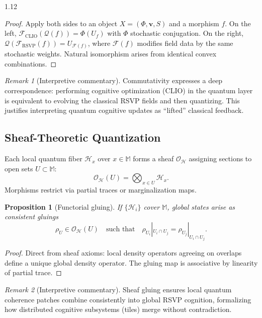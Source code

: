 \documentclass[12pt,a4paper]{article}
\numberwithin{equation}{section}
\newtheorem{proposition}{Proposition}[section]
\theoremstyle{remark}
\newtheorem{remark}{Remark}[section]
\theoremstyle{definition}
\begin{document}
\begin{spacing}{1.12}
\begin{proof}
Apply both sides to an object $X=(\Phi,\mathbf{v},S)$ and a morphism $f$. On the left, $\mathcal{F}_{\mathrm{CLIO}}(\mathcal{Q}(f))=\Phi(U_f)$ with $\Phi$ stochastic conjugation. On the right, $\mathcal{Q}(\mathcal{F}_{\mathrm{RSVP}}(f))=U_{\mathcal{F}(f)}$, where $\mathcal{F}(f)$ modifies field data by the same stochastic weights. Natural isomorphism arises from identical convex combinations.
\end{proof}

\begin{remark}[Interpretive commentary]
Commutativity expresses a deep correspondence: performing cognitive optimization (CLIO) in the quantum layer is equivalent to evolving the classical RSVP fields and then quantizing. This justifies interpreting quantum cognitive updates as “lifted” classical feedback.
\end{remark}

\subsection{Sheaf-Theoretic Quantization}\label{sec:F-sheaf}
Each local quantum fiber $\mathcal{H}_x$ over $x\in\mathbb{M}$ forms a sheaf $\mathcal{O}_{\mathcal{H}}$ assigning sections to open sets $U\subset\mathbb{M}$:
\[
\mathcal{O}_{\mathcal{H}}(U)=\bigotimes_{x\in U}\mathcal{H}_x.
\]
Morphisms restrict via partial traces or marginalization maps.

\begin{proposition}[Functorial gluing]\label{prop:F-gluing}
If $\{\mathcal{H}_i\}$ cover $\mathbb{M}$, global states arise as consistent gluings
\[
\rho_U \in \mathcal{O}_{\mathcal{H}}(U)
\quad\text{such that}\quad
\rho_{U_i}|_{U_i\cap U_j}=\rho_{U_j}|_{U_i\cap U_j}.
\]
\end{proposition}

\begin{proof}
Direct from sheaf axioms: local density operators agreeing on overlaps define a unique global density operator. The gluing map is associative by linearity of partial trace.
\end{proof}

\begin{remark}[Interpretive commentary]
Sheaf gluing ensures local quantum coherence patches combine consistently into global RSVP cognition, formalizing how distributed cognitive subsystems (tiles) merge without contradiction.
\end{remark}


\end{spacing}
\end{document}

